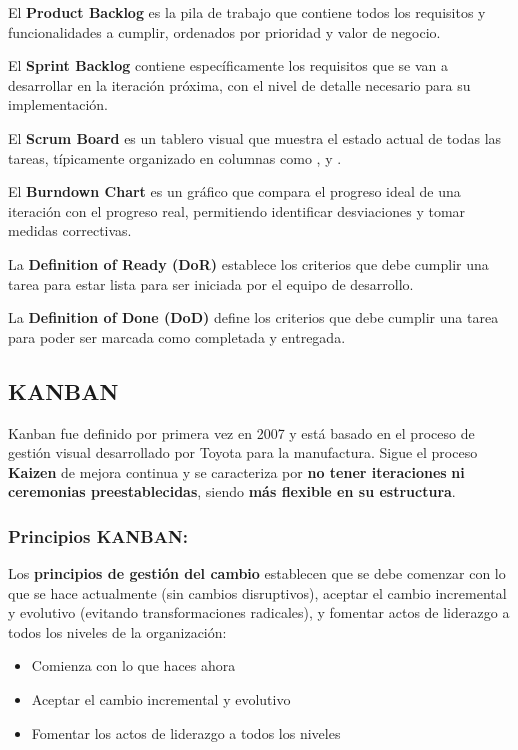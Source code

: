     El \textbf{Product Backlog} es la pila de trabajo que contiene todos los requisitos y funcionalidades a cumplir, ordenados por prioridad y valor de negocio.

    El \textbf{Sprint Backlog} contiene específicamente los requisitos que se van a desarrollar en la iteración próxima, con el nivel de detalle necesario para su implementación.

    El \textbf{Scrum Board} es un tablero visual que muestra el estado actual de todas las tareas, típicamente organizado en columnas como ,  y .

    El \textbf{Burndown Chart} es un gráfico que compara el progreso ideal de una iteración con el progreso real, permitiendo identificar desviaciones y tomar medidas correctivas.

    La \textbf{Definition of Ready (DoR)} establece los criterios que debe cumplir una tarea para estar lista para ser iniciada por el equipo de desarrollo.

    La \textbf{Definition of Done (DoD)} define los criterios que debe cumplir una tarea para poder ser marcada como completada y entregada.



    \subsection{KANBAN}\label{subsec:kanban}

    Kanban fue definido por primera vez en 2007 y está basado en el proceso de gestión visual desarrollado por Toyota para la manufactura.
    Sigue el proceso \textbf{Kaizen} de mejora continua y se caracteriza por \textbf{no tener iteraciones} \textbf{ni ceremonias preestablecidas}, siendo \textbf{más flexible en su estructura}.

    \subsubsection{Principios KANBAN:}

    Los \textbf{principios de gestión del cambio} establecen que se debe comenzar con lo que se hace actualmente (sin cambios disruptivos), aceptar el cambio incremental y evolutivo (evitando transformaciones radicales), y fomentar actos de liderazgo a todos los niveles de la organización:
    \begin{itemize}
        \item Comienza con lo que haces ahora
        \item Aceptar el cambio incremental y evolutivo
        \item Fomentar los actos de liderazgo a todos los niveles
    \end{itemize}

